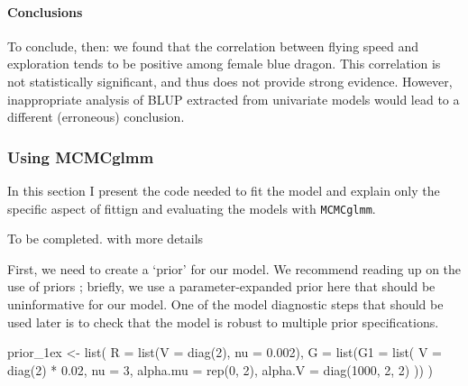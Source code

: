 \documentclass[
  12pt,
]{book}
\newenvironment{Shaded}{\begin{snugshade}}{\end{snugshade}}
\newcommand{\AttributeTok}[1]{\textcolor[rgb]{0.77,0.63,0.00}{#1}}
\newcommand{\DecValTok}[1]{\textcolor[rgb]{0.00,0.00,0.81}{#1}}
\newcommand{\FloatTok}[1]{\textcolor[rgb]{0.00,0.00,0.81}{#1}}
\newcommand{\FunctionTok}[1]{\textcolor[rgb]{0.00,0.00,0.00}{#1}}
\newcommand{\NormalTok}[1]{#1}
\newcommand{\OtherTok}[1]{\textcolor[rgb]{0.56,0.35,0.01}{#1}}
\newcommand{\SpecialCharTok}[1]{\textcolor[rgb]{0.00,0.00,0.00}{#1}}
\begin{document}
\hypertarget{conclusions-1}{%
\paragraph{Conclusions}\label{conclusions-1}}

To conclude, then: we found that the correlation between flying speed and exploration tends to be positive among female blue dragon. This correlation is not statistically significant, and thus does not provide strong evidence. However, inappropriate analysis of BLUP extracted from univariate models would lead to a different (erroneous) conclusion.

\hypertarget{using-mcmcglmm}{%
\subsubsection{Using MCMCglmm}\label{using-mcmcglmm}}

In this section I present the code needed to fit the model and explain only the specific aspect of fittign and evaluating the models with \texttt{MCMCglmm}.

To be completed. with more details

First, we need to create a `prior' for our model. We recommend reading up on the use of priors \citep[see the course notes of \texttt{MCMCglmm}][]{R-MCMCglmm}; briefly, we use a parameter-expanded prior here that should be uninformative for our model. One of the model diagnostic steps that should be used later is to check that the model is robust to multiple prior specifications.

\begin{Shaded}
\begin{Highlighting}[]
\NormalTok{prior\_1ex }\OtherTok{\textless{}{-}} \FunctionTok{list}\NormalTok{(}
  \AttributeTok{R =} \FunctionTok{list}\NormalTok{(}\AttributeTok{V =} \FunctionTok{diag}\NormalTok{(}\DecValTok{2}\NormalTok{), }\AttributeTok{nu =} \FloatTok{0.002}\NormalTok{),}
  \AttributeTok{G =} \FunctionTok{list}\NormalTok{(}\AttributeTok{G1 =} \FunctionTok{list}\NormalTok{(}
    \AttributeTok{V =} \FunctionTok{diag}\NormalTok{(}\DecValTok{2}\NormalTok{) }\SpecialCharTok{*} \FloatTok{0.02}\NormalTok{, }\AttributeTok{nu =} \DecValTok{3}\NormalTok{,}
    \AttributeTok{alpha.mu =} \FunctionTok{rep}\NormalTok{(}\DecValTok{0}\NormalTok{, }\DecValTok{2}\NormalTok{),}
    \AttributeTok{alpha.V =} \FunctionTok{diag}\NormalTok{(}\DecValTok{1000}\NormalTok{, }\DecValTok{2}\NormalTok{, }\DecValTok{2}\NormalTok{)}
\NormalTok{  ))}
\NormalTok{)}
\end{Highlighting}
\end{Shaded}
\end{document}
